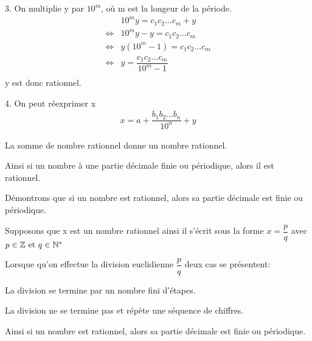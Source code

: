 \documentclass[a4paper, 12pt]{article}
\begin{document}
\begin{demonstration}
    3. On multiplie y par $10^m$, où m est la longeur de la période.
    \begin{align*}
        &10^m y = c_1c_2...c_m + y \\
        \iff& 10^m y - y = c_1c_2...c_m \\
        \iff& y(10^m - 1) = c_1c_2...c_m \\
        \iff& y = \dfrac{c_1c_2...c_m}{10^m - 1} \\
    \end{align*}
    y est donc rationnel.

    \vspace{0.5em}

    4. On peut réexprimer x
    \begin{align*}
        x = a + \dfrac{b_1b_2...b_n}{10^n} + y
    \end{align*}

    \begin{rdem}
        La somme de nombre rationnel donne un nombre rationnel.
    \end{rdem}
    
    \begin{rdem}
        Ainsi si un nombre à une partie décimale finie ou périodique, alors il est rationnel.
    \end{rdem}


\end{demonstration}

\begin{demonstration}
    Démontrons que si un nombre est rationnel, alors sa partie décimale est finie ou périodique.

    Supposons que x est un nombre rationnel ainsi il s'écrit sous la forme
    $x = \dfrac{p}{q}$ avec $p \in \mathbb{Z} \text{ et } q \in \mathbb{N}^*$

    Lorsque qu'on effectue la division euclidienne $\dfrac{p}{q}$ deux cas se présentent:

    La division se termine par un nombre fini d'étapes.

    La division ne se termine pas et répète une séquence de chiffres.

    \begin{rdem}
        Ainsi si un nombre est rationnel, alors sa partie décimale est finie ou périodique.
    \end{rdem}

\end{demonstration}
\end{document}
